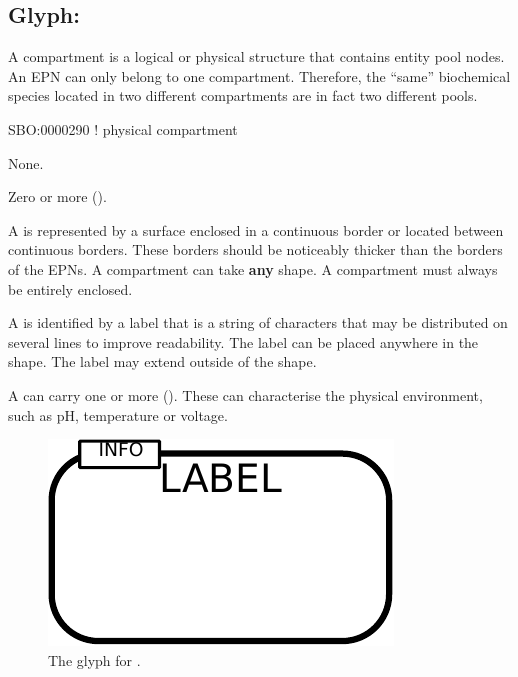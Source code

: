 \subsection{Glyph: }
\label{sec:compartment}

A compartment is a logical or physical structure that contains entity pool nodes. An EPN can only belong to one compartment. Therefore, the ``same'' biochemical species located in two different compartments are in fact two different pools.

\begin{glyphDescription}

\glyphSboTerm  SBO:0000290 ! physical compartment

\glyphIncoming
None.

\glyphOutgoing
Zero or more  ().

\glyphContainer
A  is represented by a surface enclosed in a continuous border or located between continuous borders.
These borders should be noticeably thicker than the borders of the EPNs.
A compartment can take \textbf{any} shape.
A compartment must always be entirely enclosed.

\glyphLabel
A  is identified by a label that is  a string of characters that may be distributed on several lines to improve readability.
The label can be placed anywhere in the shape.
The label may extend outside of the shape.

\glyphAux
A  can carry one or more  ().
These can characterise the physical environment, such as pH, temperature or voltage.

\end{glyphDescription}

\begin{figure}[H]
  \centering
  \includegraphics{images/build/compartment.pdf}
  \caption{The \PD glyph for .}
  \label{fig:compartment}
\end{figure}

